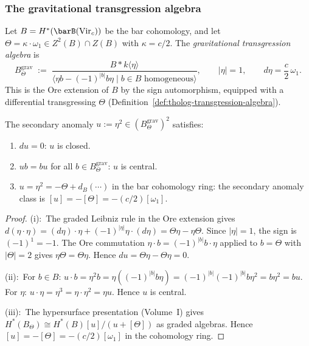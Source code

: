 \subsubsection*{The gravitational transgression algebra}

\begin{definition}
\label{def:gravity-transgression}
Let $B = H^*(\barB(\mathrm{Vir}_c))$ be the bar cohomology, and
let $\Theta = \kappa \cdot \omega_1 \in Z^2(B) \cap Z(B)$
with $\kappa = c/2$. The \emph{gravitational transgression
algebra} is
\[
B_\Theta^{\mathrm{grav}}
\;:=\;
\frac{B * k\langle \eta \rangle}
{\langle \eta b - (-1)^{|b|}b\eta
 \mid b \in B\text{ homogeneous}\rangle},
\qquad
|\eta| = 1,
\qquad
d\eta = \frac{c}{2}\,\omega_1.
\]
This is the Ore extension of $B$ by the sign automorphism,
equipped with a differential transgressing $\Theta$
\textup{(}Definition~\textup{\ref{def:tholog-transgression-algebra}}\textup{)}.
\end{definition}

\begin{proposition}
\label{prop:gravity-u-closed-central}
The secondary anomaly $u := \eta^2 \in (B_\Theta^{\mathrm{grav}})^2$
satisfies:
\begin{enumerate}[label=\textup{(\roman*)}]
\item $du = 0$: $u$ is closed.
\item $ub = bu$ for all $b \in B_\Theta^{\mathrm{grav}}$: $u$
 is central.
\item $u = \eta^2 = -\Theta + d_B(\cdots)$ in the bar cohomology
 ring: the secondary anomaly class is $[u] = -[\Theta]
 = -(c/2)[\omega_1]$.
\end{enumerate}
\end{proposition}

\begin{proof}
(i):\ The graded Leibniz rule in the Ore extension gives
$d(\eta \cdot \eta)
= (d\eta)\cdot\eta + (-1)^{|\eta|}\eta\cdot(d\eta)
= \Theta\eta - \eta\Theta$.
Since $|\eta| = 1$, the sign is $(-1)^1 = -1$.
The Ore commutation $\eta \cdot b = (-1)^{|b|}b \cdot \eta$
applied to $b = \Theta$ with $|\Theta| = 2$ gives
$\eta\Theta = \Theta\eta$.
Hence $du = \Theta\eta - \Theta\eta = 0$.

(ii):\ For $b \in B$:
$u \cdot b = \eta^2 b = \eta((-1)^{|b|} b\eta)
= (-1)^{|b|}(-1)^{|b|}b\eta^2 = b\eta^2 = bu$.
For $\eta$: $u \cdot \eta = \eta^3 = \eta \cdot \eta^2 = \eta u$.
Hence $u$ is central.

(iii):\ The hypersurface presentation
(Volume~I)
gives $H^*(B_\Theta) \cong H^*(B)[u]/(u + [\Theta])$ as graded
algebras. Hence $[u] = -[\Theta] = -(c/2)[\omega_1]$
in the cohomology ring.
\end{proof}

